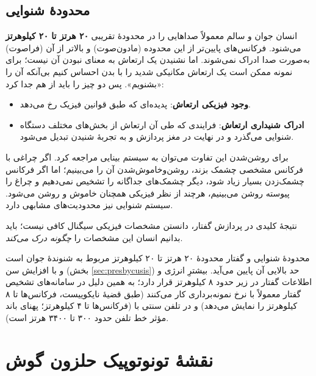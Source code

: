 \subsection{محدودهٔ شنوایی}
انسان جوان و سالم معمولاً صداهایی را در محدودهٔ تقریبی \textbf{۲۰ هرتز تا ۲۰ کیلوهرتز} می‌شنود. فرکانس‌های پایین‌تر از این محدوده (مادون‌صوت) و بالاتر از آن (فراصوت) به‌صورت صدا ادراک نمی‌شوند. اما نشنیدن یک ارتعاش به معنای نبودن آن نیست؛ برای نمونه ممکن است یک ارتعاش مکانیکی شدید را با بدن احساس کنیم بی‌آنکه آن را «بشنویم». پس دو چیز را باید از هم جدا کرد:
\begin{itemize}
  \item \textbf{وجود فیزیکی ارتعاش}: پدیده‌ای که طبق قوانین فیزیک رخ می‌دهد.
  \item \textbf{ادراک شنیداری ارتعاش}: فرایندی که طی آن ارتعاش از بخش‌های مختلف دستگاه شنوایی می‌گذرد و در نهایت در مغز پردازش و به تجربهٔ شنیدن تبدیل می‌شود.
\end{itemize}

برای روشن‌شدن این تفاوت می‌توان به سیستم بینایی مراجعه کرد. اگر چراغی با فرکانس مشخصی چشمک بزند، روشن‌وخاموش‌شدن آن را می‌بینیم؛ اما اگر فرکانس چشمک‌زدن بسیار زیاد شود، دیگر چشمک‌های جداگانه را تشخیص نمی‌دهیم و چراغ را پیوسته روشن می‌بینیم، هرچند از نظر فیزیکی همچنان خاموش و روشن می‌شود. سیستم شنوایی نیز محدودیت‌های مشابهی دارد.

\begin{exambox}{نتیجهٔ کلیدی}
در پردازش گفتار، دانستن مشخصات فیزیکی سیگنال کافی نیست؛ باید بدانیم انسان این مشخصات را \emph{چگونه درک می‌کند}.
\end{exambox}

\begin{addedbox}{محدودهٔ شنوایی و گفتار}
محدودهٔ ۲۰ هرتز تا ۲۰ کیلوهرتز مربوط به شنوندهٔ جوان است و با افزایش سن (بخش \ref{sec:presbycusis}) حد بالایی آن پایین می‌آید. بیشترِ انرژی و اطلاعات گفتار در زیر حدود ۸ کیلوهرتز قرار دارد؛ به همین دلیل در سامانه‌های تشخیص گفتار معمولاً با نرخ نمونه‌برداری  کار می‌کنند (طبق قضیهٔ نایکوییست، فرکانس‌ها تا ۸ کیلوهرتز را نمایش می‌دهد) و در تلفن سنتی با  (فرکانس‌ها تا ۴ کیلوهرتز؛ پهنای باند مؤثر خط تلفن حدود ۳۰۰ تا ۳۴۰۰ هرتز است).
\end{addedbox}

\section{نقشهٔ تونوتوپیک حلزون گوش}

